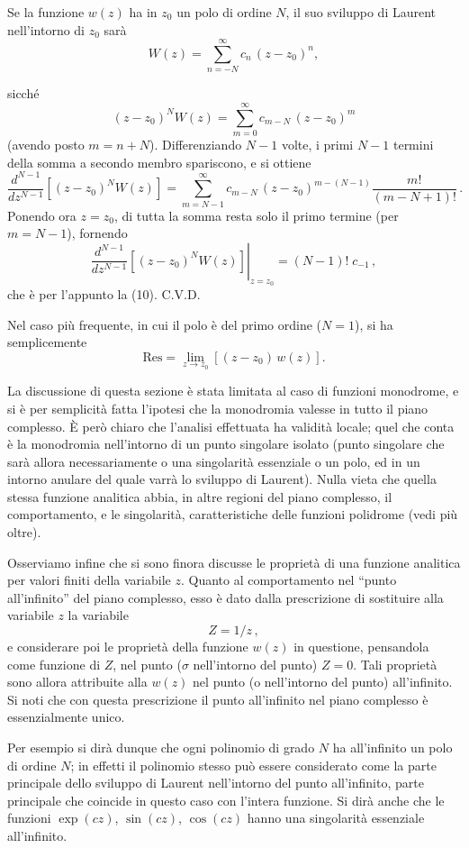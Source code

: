 \documentclass[11pt, a4paper]{book}
\numberwithin{equation}{section}
\begin{document}
Se la funzione $w(z)$ ha in $z_0$ un polo di ordine $N$, il suo sviluppo di Laurent nell'intorno di $z_0$ sarà
\[
W(z) = \sum_{n=-N}^{\infty} c_n\,(z-z_0)^n,
\]

sicché
\[
(z-z_0)^N W(z) = \sum_{m=0}^{\infty} c_{m-N}\,(z-z_0)^m
\]
(avendo posto $m = n + N$). Differenziando $N-1$ volte, i primi $N-1$ termini della somma a secondo membro spariscono, e si ottiene
\[
\frac{d^{N-1}}{dz^{N-1}}\left[(z-z_0)^N W(z)\right] = \sum_{m=N-1}^{\infty} c_{m-N}\,(z-z_0)^{m-(N-1)}\frac{m!}{(m-N+1)!}\,.
\]
Ponendo ora $z = z_0$, di tutta la somma resta solo il primo termine (per $m = N-1$), fornendo
\[
\left.\frac{d^{N-1}}{dz^{N-1}}\left[(z-z_0)^N W(z)\right]\right|_{z=z_0} = (N-1)!\; c_{-1}\,,
\]
che è per l'appunto la (10). C.V.D.

Nel caso più frequente, in cui il polo è del primo ordine ($N=1$), si ha semplicemente
\begin{equation}
\mathrm{Res} = \lim_{z \to z_0}\left[(z-z_0)\,w(z)\right]. \tag{11}
\end{equation}

La discussione di questa sezione è stata limitata al caso di funzioni monodrome, e si è per semplicità fatta l'ipotesi che la monodromia valesse in tutto il piano complesso. È però chiaro che l'analisi effettuata ha validità locale; quel che conta è la monodromia nell'intorno di un punto singolare isolato (punto singolare che sarà allora necessariamente o una singolarità essenziale o un polo, ed in un intorno anulare del quale varrà lo sviluppo di Laurent). Nulla vieta che quella stessa funzione analitica abbia, in altre regioni del piano complesso, il comportamento, e le singolarità, caratteristiche delle funzioni polidrome (vedi più oltre).

Osserviamo infine che si sono finora discusse le proprietà di una funzione analitica per valori finiti della variabile $z$. Quanto al comportamento nel ``punto all'infinito'' del piano complesso, esso è dato dalla prescrizione di sostituire alla variabile $z$ la variabile
\[
Z = 1/z\,,
\]
e considerare poi le proprietà della funzione $w(z)$ in questione, pensandola come funzione di $Z$, nel punto ($\sigma$ nell'intorno del punto) $Z=0$. Tali proprietà sono allora attribuite alla $w(z)$ nel punto (o nell'intorno del punto) all'infinito. Si noti che con questa prescrizione il punto all'infinito nel%
piano complesso è essenzialmente unico.

Per esempio si dirà dunque che ogni polinomio di grado $N$ ha all'infinito un polo di ordine $N$; in effetti il polinomio stesso può essere considerato come la parte principale dello sviluppo di Laurent nell'intorno del punto all'infinito, parte principale che coincide in questo caso con l'intera funzione. Si dirà anche che le funzioni $\exp(cz)$, $\sin(cz)$, $\cos(cz)$ hanno una singolarità essenziale all'infinito.
\end{document}
